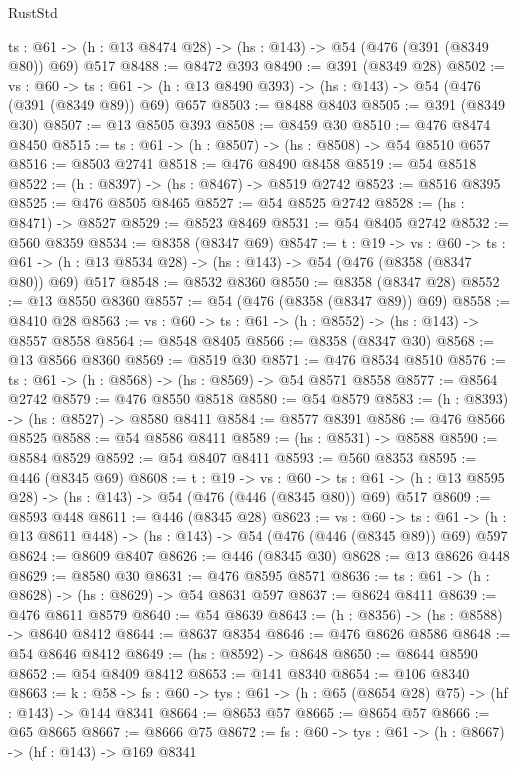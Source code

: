 \begin{lexlean}{RustStd}
\begin{coremodule}
  {ts : @61} -> (h : @13 @8474 @28) -> (hs : @143) -> @54 (@476 (@391 (@8349 @80)) @69) @517
@8488 := @8472 @393
@8490 := @391 (@8349 @28)
@8502 := {vs : @60} ->
  {ts : @61} -> (h : @13 @8490 @393) -> (hs : @143) -> @54 (@476 (@391 (@8349 @89)) @69) @657
@8503 := @8488 @8403
@8505 := @391 (@8349 @30)
@8507 := @13 @8505 @393
@8508 := @8459 @30
@8510 := @476 @8474 @8450
@8515 := {ts : @61} -> (h : @8507) -> (hs : @8508) -> @54 @8510 @657
@8516 := @8503 @2741
@8518 := @476 @8490 @8458
@8519 := @54 @8518
@8522 := (h : @8397) -> (hs : @8467) -> @8519 @2742
@8523 := @8516 @8395
@8525 := @476 @8505 @8465
@8527 := @54 @8525 @2742
@8528 := (hs : @8471) -> @8527
@8529 := @8523 @8469
@8531 := @54 @8405 @2742
@8532 := @560 @8359
@8534 := @8358 (@8347 @69)
@8547 := {t : @19} ->
  {vs : @60} ->
  {ts : @61} -> (h : @13 @8534 @28) -> (hs : @143) -> @54 (@476 (@8358 (@8347 @80)) @69) @517
@8548 := @8532 @8360
@8550 := @8358 (@8347 @28)
@8552 := @13 @8550 @8360
@8557 := @54 (@476 (@8358 (@8347 @89)) @69)
@8558 := @8410 @28
@8563 := {vs : @60} -> {ts : @61} -> (h : @8552) -> (hs : @143) -> @8557 @8558
@8564 := @8548 @8405
@8566 := @8358 (@8347 @30)
@8568 := @13 @8566 @8360
@8569 := @8519 @30
@8571 := @476 @8534 @8510
@8576 := {ts : @61} -> (h : @8568) -> (hs : @8569) -> @54 @8571 @8558
@8577 := @8564 @2742
@8579 := @476 @8550 @8518
@8580 := @54 @8579
@8583 := (h : @8393) -> (hs : @8527) -> @8580 @8411
@8584 := @8577 @8391
@8586 := @476 @8566 @8525
@8588 := @54 @8586 @8411
@8589 := (hs : @8531) -> @8588
@8590 := @8584 @8529
@8592 := @54 @8407 @8411
@8593 := @560 @8353
@8595 := @446 (@8345 @69)
@8608 := {t : @19} ->
  {vs : @60} ->
  {ts : @61} -> (h : @13 @8595 @28) -> (hs : @143) -> @54 (@476 (@446 (@8345 @80)) @69) @517
@8609 := @8593 @448
@8611 := @446 (@8345 @28)
@8623 := {vs : @60} ->
  {ts : @61} -> (h : @13 @8611 @448) -> (hs : @143) -> @54 (@476 (@446 (@8345 @89)) @69) @597
@8624 := @8609 @8407
@8626 := @446 (@8345 @30)
@8628 := @13 @8626 @448
@8629 := @8580 @30
@8631 := @476 @8595 @8571
@8636 := {ts : @61} -> (h : @8628) -> (hs : @8629) -> @54 @8631 @597
@8637 := @8624 @8411
@8639 := @476 @8611 @8579
@8640 := @54 @8639
@8643 := (h : @8356) -> (hs : @8588) -> @8640 @8412
@8644 := @8637 @8354
@8646 := @476 @8626 @8586
@8648 := @54 @8646 @8412
@8649 := (hs : @8592) -> @8648
@8650 := @8644 @8590
@8652 := @54 @8409 @8412
@8653 := @141 @8340
@8654 := @106 @8340
@8663 := {k : @58} ->
  {fs : @60} -> {tys : @61} -> (h : @65 (@8654 @28) @75) -> (hf : @143) -> @144 @8341
@8664 := @8653 @57
@8665 := @8654 @57
@8666 := @65 @8665
@8667 := @8666 @75
@8672 := {fs : @60} -> {tys : @61} -> (h : @8667) -> (hf : @143) -> @169 @8341

\end{coremodule}
\end{lexlean}
